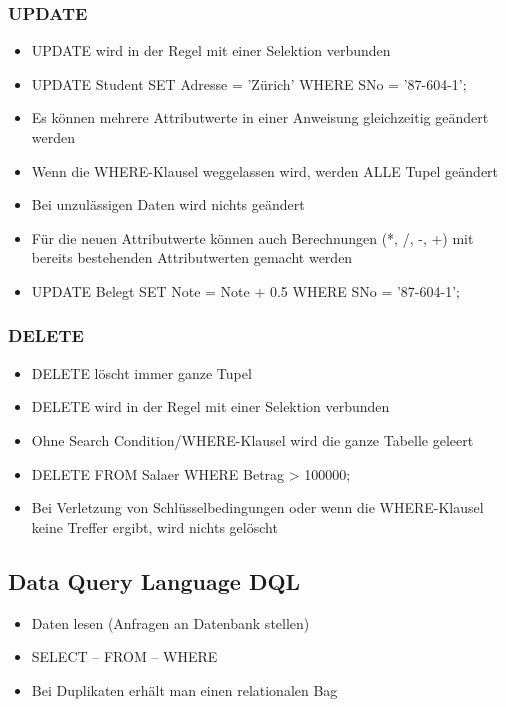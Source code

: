 \documentclass[8pt,a4paper]{scrartcl}
\begin{document}
\begin{multicols*}{3}
				\subsubsection{UPDATE}
					\begin{itemize}\itemsep0pt		
						\item UPDATE wird in der Regel mit einer Selektion verbunden
						\item UPDATE Student SET Adresse = 'Zürich' WHERE SNo = '87-604-1'$;$
						\item Es können mehrere Attributwerte in einer Anweisung gleichzeitig geändert werden
						\item Wenn die WHERE-Klausel weggelassen wird, werden ALLE Tupel geändert
						\item Bei unzulässigen Daten wird nichts geändert
						\item Für die neuen Attributwerte können auch Berechnungen (*, /, -, +) mit bereits
bestehenden Attributwerten gemacht werden
						\item UPDATE Belegt SET Note = Note + 0.5 WHERE SNo = '87-604-1'$;$
					\end{itemize}	
					
				\subsubsection{DELETE}
					\begin{itemize}\itemsep0pt		
						\item DELETE löscht immer ganze Tupel
						\item DELETE wird in der Regel mit einer Selektion verbunden
						\item Ohne Search Condition/WHERE-Klausel wird die ganze Tabelle geleert
						\item DELETE FROM Salaer WHERE Betrag > 100000;
						\item Bei Verletzung von Schlüsselbedingungen oder wenn die WHERE-Klausel
keine Treffer ergibt, wird nichts gelöscht
					\end{itemize}	
				
			\subsection{Data Query Language DQL}
				\begin{itemize}\itemsep0pt		
					\item Daten lesen (Anfragen an Datenbank stellen)
					\item SELECT – FROM – WHERE
					\item Bei Duplikaten erhält man einen relationalen Bag
				\end{itemize}			
				

\end{multicols*}
\end{document}
